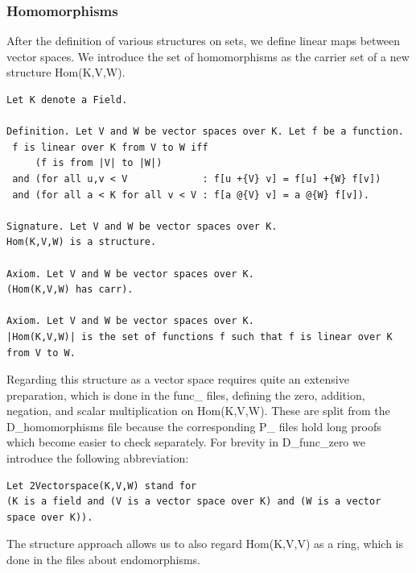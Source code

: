 \documentclass[11pt]{article}
\begin{document}
\subsubsection{Homomorphisms}

After the definition of various structures on sets, we define linear maps between vector spaces.
We introduce the set of homomorphisms as the carrier set of a new structure Hom(K,V,W).
\begin{lstlisting}
Let K denote a Field.

Definition. Let V and W be vector spaces over K. Let f be a function.
 f is linear over K from V to W iff
     (f is from |V| to |W|)
 and (for all u,v < V             : f[u +{V} v] = f[u] +{W} f[v])
 and (for all a < K for all v < V : f[a @{V} v] = a @{W} f[v]).

Signature. Let V and W be vector spaces over K.
Hom(K,V,W) is a structure.

Axiom. Let V and W be vector spaces over K.
(Hom(K,V,W) has carr).

Axiom. Let V and W be vector spaces over K.
|Hom(K,V,W)| is the set of functions f such that f is linear over K from V to W.
\end{lstlisting}

Regarding this structure as a vector space requires quite an extensive preparation, which is done in the func\_ files, defining the zero, addition, negation, and scalar multiplication on Hom(K,V,W). These are split from the D\_homomorphisms file because the corresponding P\_ files hold long proofs which become easier to check separately.
For brevity in D\_func\_zero we introduce the following abbreviation:
\begin{lstlisting}
Let 2Vectorspace(K,V,W) stand for
(K is a field and (V is a vector space over K) and (W is a vector space over K)).
\end{lstlisting}

The {\ftl structure} approach allows us to also regard Hom(K,V,V) as a ring, which is done in the files about endomorphisms.
\end{document}
